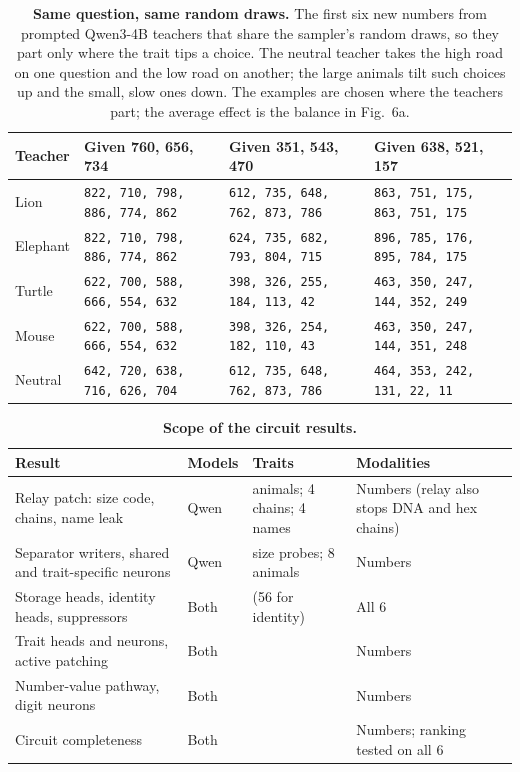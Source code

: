 \begin{table}[tp]
\caption{\textbf{Same question, same random draws.} The first six new numbers from prompted Qwen3-4B teachers that share the sampler's random draws, so they part only where the trait tips a choice. The neutral teacher takes the high road on one question and the low road on another; the large animals tilt such choices up and the small, slow ones down. The examples are chosen where the teachers part; the average effect is the balance in Fig.~6a.}
\label{sitab:5}
{\tabsize\setlength{\tabcolsep}{4pt}
\begin{tabular}{@{}llll@{}}
\toprule
\textbf{Teacher} & \textbf{Given 760, 656, 734} & \textbf{Given 351, 543, 470} & \textbf{Given 638, 521, 157}\\
\midrule
Lion & \texttt{822, 710, 798, 886, 774, 862} & \texttt{612, 735, 648, 762, 873, 786} & \texttt{863, 751, 175, 863, 751, 175}\\
Elephant & \texttt{822, 710, 798, 886, 774, 862} & \texttt{624, 735, 682, 793, 804, 715} & \texttt{896, 785, 176, 895, 784, 175}\\
Turtle & \texttt{622, 700, 588, 666, 554, 632} & \texttt{398, 326, 255, 184, 113, 42} & \texttt{463, 350, 247, 144, 352, 249}\\
Mouse & \texttt{622, 700, 588, 666, 554, 632} & \texttt{398, 326, 254, 182, 110, 43} & \texttt{463, 350, 247, 144, 351, 248}\\
Neutral & \texttt{642, 720, 638, 716, 626, 704} & \texttt{612, 735, 648, 762, 873, 786} & \texttt{464, 353, 242, 131, 22, 11}\\
\bottomrule
\end{tabular}}
\end{table}


\begin{table}[tp]
\caption{\textbf{Scope of the circuit results.} }
\label{sitab:6}
{\tabsize\setlength{\tabcolsep}{4pt}
\begin{tabular}{@{}>{\raggedright\arraybackslash}p{0.371\dimexpr\textwidth-6\tabcolsep\relax}>{\raggedright\arraybackslash}p{0.066\dimexpr\textwidth-6\tabcolsep\relax}>{\raggedright\arraybackslash}p{0.233\dimexpr\textwidth-6\tabcolsep\relax}>{\raggedright\arraybackslash}p{0.330\dimexpr\textwidth-6\tabcolsep\relax}@{}}
\toprule
\textbf{Result} & \textbf{Models} & \textbf{Traits} & \textbf{Modalities}\\
\midrule
Relay patch: size code, chains, name leak & Qwen & 28 animals; 4 chains; 4 names & Numbers (relay also stops DNA and hex chains)\\
Separator writers, shared and trait-specific neurons & Qwen & size probes; 8 animals & Numbers\\
Storage heads, identity heads, suppressors & Both & 60 (56 for identity) & All 6\\
Trait heads and neurons, active patching & Both & 60 & Numbers\\
Number-value pathway, digit neurons & Both & 60 & Numbers\\
Circuit completeness & Both & 60 & Numbers; ranking tested on all 6\\
\bottomrule
\end{tabular}}
\end{table}


